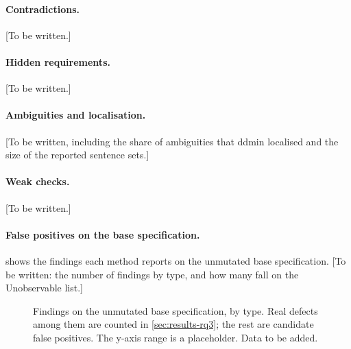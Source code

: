 \paragraph{Contradictions.} [To be written.]

\paragraph{Hidden requirements.} [To be written.]

\paragraph{Ambiguities and localisation.} [To be written, including the share of ambiguities that ddmin localised and the size of the reported sentence sets.]

\paragraph{Weak checks.} [To be written.]

\paragraph{False positives on the base specification.}  shows the findings each method reports on the unmutated base specification. [To be written: the number of findings by type, and how many fall on the Unobservable list.]

\begin{figure}[t]
\centering
{}
\caption{Findings on the unmutated base specification, by type. Real defects among them are counted in \cref{sec:results-rq3}; the rest are candidate false positives. The y-axis range is a placeholder. Data to be added.}
\label{fig:base-findings}
\end{figure}

